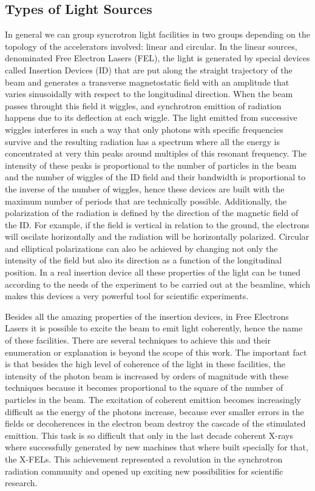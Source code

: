 \documentclass[
	12pt,				%
	openright,			%
	oneside,			%
	a4paper,		%
	chapter=TITLE,		%
	section=TITLE,		%
    brazil,				%
	english,			%
	sumario=tradicional,
	]{abntex2}
\begin{document}
    \subsection{Types of Light Sources}

    In general we can group syncrotron light facilities in two groups depending on the topology of the accelerators involved: linear and circular. In the linear sources, denominated Free Electron Lasers (FEL), the light is generated by special devices called Insertion Devices (ID) that are put along the straight trajectory of the beam and generates a transverse magnetostatic field with an amplitude that varies sinusoidally with respect to the longitudinal direction. When the beam passes throught this field it wiggles, and synchrotron emittion of radiation happens due to its deflection at each wiggle. The light emitted from successive wiggles interferes in such a way that only photons with specific frequencies survive and the resulting radiation has a spectrum where all the energy is concentrated at very thin peaks around multiples of this resonant frequency. The intensity of these peaks is proportional to the number of particles in the beam and the number of wiggles of the ID field and their bandwidth is proportional to the inverse of the number of wiggles, hence these devices are built with the maximum number of periods that are technically possible. Additionally, the polarization of the radiation is defined by the direction of the magnetic field of the ID. For example, if the field is vertical in relation to the ground, the electrons will oscilate horizontally and the radiation will be horizontally polarized. Circular and elliptical polarizations can also be achieved by changing not only the intensity of the field but also its direction as a function of the longitudinal position. In a real insertion device all these properties of the light can be tuned according to the needs of the experiment to be carried out at the beamline, which makes this devices a very powerful tool for scientific experiments.

    Besides all the amazing properties of the insertion devices, in Free Electrons Lasers it is possible to excite the beam to emit light coherently, hence the name of these facilities. There are several techniques to achieve this and their enumeration or explanation is beyond the scope of this work. The important fact is that besides the high level of coherence of the light in these facilities, the intensity of the photon beam is increased by orders of magnitude with these techniques because it becomes proportional to the square of the number of particles in the beam. The excitation of coherent emittion becomes increasingly difficult as the energy of the photons increase, because ever smaller errors in the fields or decoherences in the electron beam destroy the cascade of the stimulated emittion. This task is so difficult that only in the last decade coherent X-rays where successfully generated by new machines that where built specially for that, the X-FELs. This achievement represented a revolution in the synchrotron radiation community and opened up exciting new possibilities for scientific research.
\end{document}
